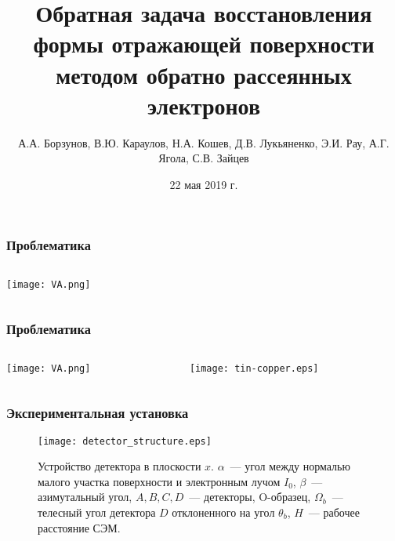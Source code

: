 \documentclass{beamer}
\title{Обратная задача восстановления формы отражающей поверхности методом обратно рассеянных электронов}
\author{А.А. Борзунов, В.Ю. Караулов, Н.А. Кошев, Д.В. Лукьяненко, Э.И. Рау, А.Г. Ягола, С.В. Зайцев}
\institute{Московский Государственный Университет им. М.В. Ломоносова}
\date{22 мая 2019 г.}
\begin{document}
\frame{\titlepage}

\begin{frame}
    \frametitle{Проблематика}
    \begin{columns}
        \begin{column}{0.40\textwidth}
            \texttt{[image: VA.png]}
        \end{column}
        \begin{column}{0.6\textwidth}
        \end{column}
    \end{columns}
\end{frame}

\begin{frame}
    \frametitle{Проблематика}
    \begin{columns}
        \begin{column}{0.40\textwidth}
            \texttt{[image: VA.png]}
        \end{column}
        \begin{column}{0.6\textwidth}
            \texttt{[image: tin-copper.eps]}
        \end{column}
    \end{columns}
\end{frame}

\begin{frame}
    \frametitle{Экспериментальная установка}
    \begin{figure}
        \texttt{[image: detector\_structure.eps]}
        \caption{Устройство детектора в плоскости $x$. $\alpha$~--- угол между нормалью малого участка поверхности и электронным лучом $I_0$, $\beta$~--- азимутальный угол, $A,B,C,D$~--- детекторы, O-образец, $\Omega_{b}$~--- телесный угол детектора $D$ отклоненного на угол $\theta_b$, $H$~--- рабочее расстояние СЭМ.}
        {\label{fig:detector_structure}}%
    \end{figure}
\end{frame}
\end{document}
